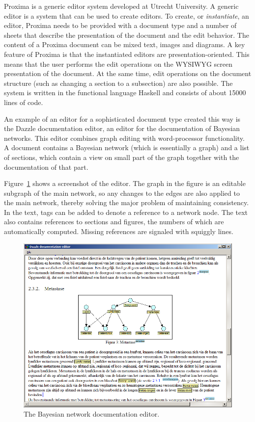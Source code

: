 \documentclass[10pt]{article}
\begin{document}
Proxima is a generic editor system developed at Utrecht University. A generic editor is a system that can be used to create editors. To create, or {\em instantiate}, an editor, Proxima needs to be provided with a document type and a number of sheets that describe the presentation of the document and the edit behavior. The content of a Proxima document can be mixed text, images and diagrams. A key feature of Proxima is that the instantiated editors are presentation-oriented. This means that the user performs the edit operations on the WYSIWYG screen presentation of the document. At the same time, edit operations on the document structure (such as changing a section to a subsection) are also possible. The system is written in the functional language Haskell and consists of about 15000 lines of code.

An example of an editor for a sophisticated document type created this way is the Dazzle documentation editor, an editor for the documentation of Bayesian networks. This editor combines graph editing with word-processor functionality. A document contains a Bayesian network (which is essentially a graph) and a list of sections, which contain a view on small part of the graph together with the documentation of that part. 

Figure~\ref{fig:bayesDocEditor} shows a screenshot of the editor. The graph in the figure is an editable subgraph of the main network, so any changes to the edges are also applied to the main network, thereby solving the major problem of maintaining consistency. In the text, tags can be added to denote a reference to a network node. The text also contains references to sections and figures, the numbers of which are automatically computed. Missing references are signaled with squiggly lines.

\begin{figure}[t]
\begin{center}
\includegraphics[width=12cm]{images/subgraph}
\end{center}
\caption{The Bayesian network documentation editor.}
\label{fig:bayesDocEditor}
\end{figure}
\end{document}
